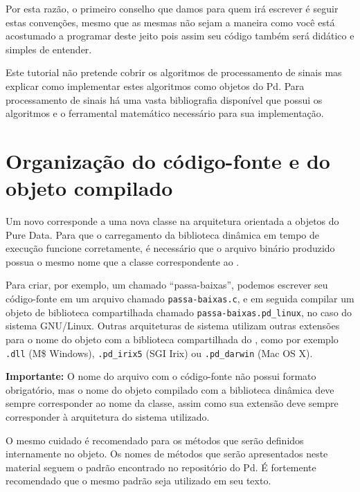 Por esta razão, o primeiro conselho que damos para quem irá escrever \externals é seguir
estas convenções, mesmo que as mesmas não sejam a maneira como você está acostumado a 
programar deste jeito pois assim seu código também será didático e simples de entender.

Este tutorial não pretende cobrir os algoritmos de processamento de sinais mas explicar
como implementar estes algoritmos como objetos do Pd. Para processamento de sinais há
uma vasta bibliografia disponível que possui os algoritmos e o ferramental matemático
necessário para sua implementação.

\section{Organização do código-fonte e do objeto compilado}
\label{sec:organizacao}

Um novo \external corresponde a uma nova classe na arquitetura orientada a
objetos do Pure Data. Para que o carregamento da biblioteca dinâmica
em tempo de execução funcione corretamente, é necessário que o
arquivo binário produzido possua o mesmo nome que a classe correspondente ao
\external.

Para criar, por exemplo, um \external chamado ``passa-baixas'', podemos
escrever seu código-fonte em um arquivo chamado \texttt{passa-baixas.c}, e em
seguida compilar um objeto de biblioteca compartilhada chamado
\texttt{passa-baixas.pd\_linux}, no caso do sistema GNU/Linux.
Outras arquiteturas de sistema utilizam outras extensões para o nome do objeto com a
biblioteca compartilhada do \external, como por exemplo \texttt{.dll} (M\$
Windows), \texttt{.pd\_irix5} (SGI Irix) ou \texttt{.pd\_darwin} (Mac OS X).

\textbf{Importante:} O nome do arquivo com o código-fonte não possui formato
obrigatório, mas o nome do objeto compilado com a biblioteca dinâmica deve
sempre corresponder ao nome da classe, assim como sua extensão deve sempre
corresponder à arquitetura do sistema utilizado.

O mesmo cuidado é recomendado para os métodos que serão definidos internamente
no objeto. Os nomes de métodos que serão apresentados neste material seguem o padrão
encontrado no repositório do Pd.
É fortemente recomendado que o mesmo padrão seja utilizado em seu texto.

